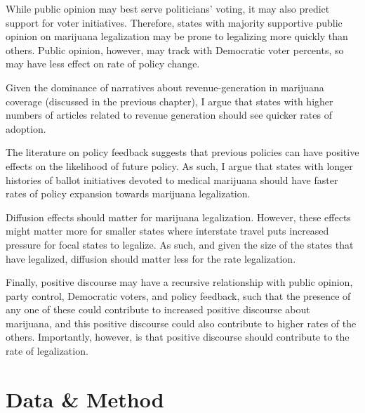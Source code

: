 While public opinion may best serve politicians' voting, it may also predict support for voter initiatives. Therefore, states with majority supportive public opinion on marijuana legalization may be prone to legalizing more quickly than others. Public opinion, however, may track with Democratic voter percents, so may have less effect on rate of policy change. 

Given the dominance of narratives about revenue-generation in marijuana coverage (discussed in the previous chapter), I argue that states with higher numbers of articles related to revenue generation should see quicker rates of adoption. 

The literature on policy feedback suggests that previous policies can have positive effects on the likelihood of future policy. As such, I argue that states with longer histories of ballot initiatives devoted to medical marijuana should have faster rates of policy expansion towards marijuana legalization. 

Diffusion effects should matter for marijuana legalization. However, these effects might matter more for smaller states where interstate travel puts increased pressure for focal states to legalize. As such, and given the size of the states that have legalized, diffusion should matter less for the rate legalization. 




Finally, positive discourse may have a recursive relationship with public opinion, party control, Democratic voters, and policy feedback, such that the presence of any one of these could contribute to increased positive discourse about marijuana, and this positive discourse could also contribute to higher rates of the others. Importantly, however, is that positive discourse should contribute to the rate of legalization. 




\section{Data \& Method}

